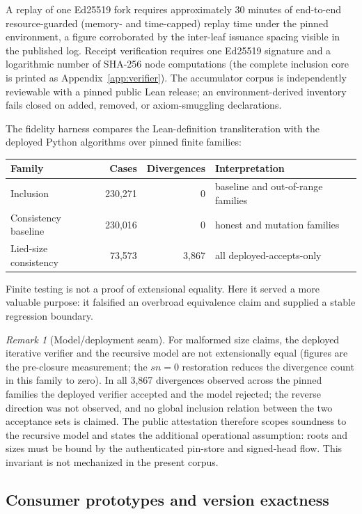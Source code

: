\documentclass[11pt]{article}
\theoremstyle{remark}
\newtheorem{remark}{Remark}
\begin{document}
A replay of one Ed25519 fork requires approximately 30 minutes of end-to-end
resource-guarded (memory- and time-capped) replay time under the pinned environment, a figure corroborated by the
inter-leaf issuance spacing visible in the published log. Receipt verification requires one Ed25519
signature and a logarithmic number of SHA-256 node computations (the
complete inclusion core is printed as Appendix~\ref{app:verifier}). The
accumulator corpus is independently reviewable with a pinned public Lean
release; an environment-derived inventory fails closed on added, removed, or
axiom-smuggling declarations.

The fidelity harness compares the Lean-definition transliteration with the
deployed Python algorithms over pinned finite families:
\begin{center}\small
\begin{tabular}{@{}lrrl@{}}
\toprule
Family & Cases & Divergences & Interpretation \\
\midrule
Inclusion & 230,271 & 0 & baseline and out-of-range families \\
Consistency baseline & 230,016 & 0 & honest and mutation families \\
Lied-size consistency & 73,573 & 3,867 & all deployed-accepts-only \\
\bottomrule
\end{tabular}
\end{center}
Finite testing is not a proof of extensional equality. Here it served a more
valuable purpose: it falsified an overbroad equivalence claim and supplied a
stable regression boundary.

\begin{remark}[Model/deployment seam]
For malformed size claims, the deployed iterative verifier and the recursive
model are not extensionally equal (figures are the pre-closure measurement;
the $sn=0$ restoration reduces the divergence count in this family to zero).
In all 3,867 divergences observed across
the pinned families the deployed verifier accepted and the model rejected; the
reverse direction was not observed, and no global inclusion relation between
the two acceptance sets is claimed.
The public attestation therefore scopes soundness to the recursive model and
states the additional operational assumption: roots and sizes must be bound by
the authenticated pin-store and signed-head flow. This invariant is not
mechanized in the present corpus.
\end{remark}

\subsection{Consumer prototypes and version exactness}
\end{document}
